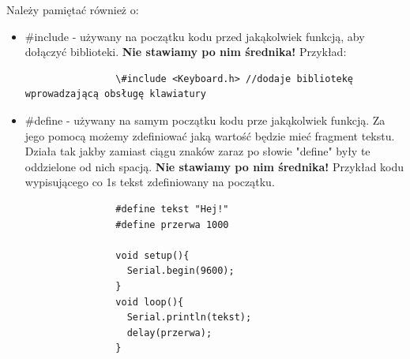 \documentclass[a4paper,12pt, twoside]{article}
\begin{document}
	Należy pamiętać również o:
	\begin{itemize}
		\item \#include - używany na początku kodu przed jakąkolwiek funkcją, aby dołączyć biblioteki. \textbf{Nie stawiamy po nim średnika!} Przykład:
			\begin{verbatim}
				\#include <Keyboard.h> //dodaje bibliotekę wprowadzającą obsługę klawiatury
			\end{verbatim}
		\item \#define - używany na samym początku kodu prze jakąkolwiek funkcją. Za jego pomocą możemy zdefiniować jaką wartość będzie mieć fragment tekstu.
		Działa tak jakby zamiast ciągu znaków zaraz po słowie "define" były te oddzielone od nich spacją. \textbf{Nie stawiamy po nim średnika!} Przykład kodu wypisującego co 1s tekst zdefiniowany na początku.
			\begin{verbatim}
				#define tekst "Hej!"
				#define przerwa 1000
				
				void setup(){
				  Serial.begin(9600);
				}
				void loop(){
				  Serial.println(tekst);
				  delay(przerwa);
				}
			\end{verbatim}
	\end{itemize}
\end{document}
